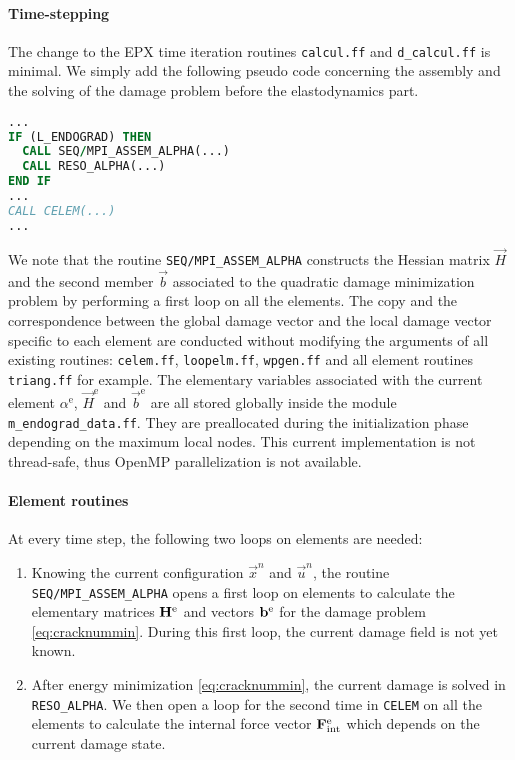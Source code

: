 \paragraph{Time-stepping} The change to the EPX time iteration routines \texttt{calcul.ff} and \texttt{d\_calcul.ff} is minimal. We simply add the following pseudo code concerning the assembly and the solving of the damage problem before the elastodynamics part.
\begin{lstlisting}[language=Fortran]
...
IF (L_ENDOGRAD) THEN
  CALL SEQ/MPI_ASSEM_ALPHA(...)
  CALL RESO_ALPHA(...)
END IF
...
CALL CELEM(...)
...
\end{lstlisting}

We note that the routine \texttt{SEQ/MPI\_ASSEM\_ALPHA} constructs the Hessian matrix $\vec{H}$ and the second member $\vec{b}$ associated to the quadratic damage minimization problem by performing a first loop on all the elements. The copy and the correspondence between the global damage vector and the local damage vector specific to each element are conducted without modifying the arguments of all existing routines: \texttt{celem.ff}, \texttt{loopelm.ff}, \texttt{wpgen.ff} and all element routines \texttt{triang.ff} for example. The elementary variables associated with the current element $\alpha^\mathrm{e}$, $\vec{H}^\mathrm{e}$ and $\vec{b}^\mathrm{e}$ are all stored globally inside the module \texttt{m\_endograd\_data.ff}. They are preallocated during the initialization phase depending on the maximum local nodes. This current implementation is not thread-safe, thus OpenMP parallelization is not available.

\paragraph{Element routines} At every time step, the following two loops on elements are needed:
\begin{enumerate}
\item Knowing the current configuration $\vec{x}^n$ and $\vec{u}^n$, the routine \texttt{SEQ/MPI\_ASSEM\_ALPHA} opens a first loop on elements to calculate the elementary matrices $\vec{H}^\me$ and vectors $\vec{b}^\me$ for the damage problem \eqref{eq:cracknummin}. During this first loop, the current damage field is not yet known.

\item After energy minimization \eqref{eq:cracknummin}, the current damage is solved in \texttt{RESO\_ALPHA}. We then open a loop for the second time in \texttt{CELEM} on all the elements to calculate the internal force vector $\vec{F}_\mathrm{int}^\me$ which depends on the current damage state.
\end{enumerate}


